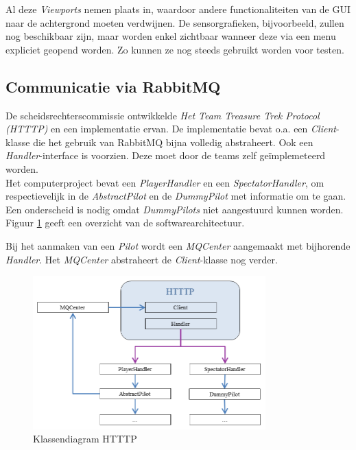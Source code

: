\documentclass[tt2]{penoverslag}
\begin{document}
Al deze \textit{Viewports} nemen plaats in, waardoor andere functionaliteiten van de GUI naar de achtergrond moeten verdwijnen. De sensorgrafieken, bijvoorbeeld, zullen nog beschikbaar zijn, maar worden enkel zichtbaar wanneer deze via een menu expliciet geopend worden. Zo kunnen ze nog steeds gebruikt worden voor testen.



\subsection{Communicatie via RabbitMQ}
\label{ssec:RabbMQ}
De scheidsrechterscommissie ontwikkelde \textit{Het Team Treasure Trek Protocol (HTTTP)} en een implementatie ervan. De implementatie bevat o.a. een \textit{Client}-klasse die het gebruik van RabbitMQ bijna volledig abstraheert. Ook een \textit{Handler}-interface is voorzien. Deze moet door de teams zelf ge\"implemeteerd worden.\\

Het computerproject bevat een \textit{PlayerHandler} en een \textit{SpectatorHandler}, om respectievelijk in de \textit{AbstractPilot} en de \textit{DummyPilot} met informatie om te gaan. Een onderscheid is nodig omdat \textit{DummyPilots} niet aangestuurd kunnen worden. Figuur \ref{fig:KlasHTTTP} geeft een overzicht van de softwarearchitectuur.

Bij het aanmaken van een \textit{Pilot} wordt een \textit{MQCenter} aangemaakt met bijhorende \textit{Handler}. Het \textit{MQCenter} abstraheert de \textit{Client}-klasse nog verder.

\begin{figure}[h]
\centering
	\includegraphics[width=0.8\textwidth]{KlasHTTTP}
\caption{Klassendiagram HTTTP}
\label{fig:KlasHTTTP}
\end{figure}
\end{document}
